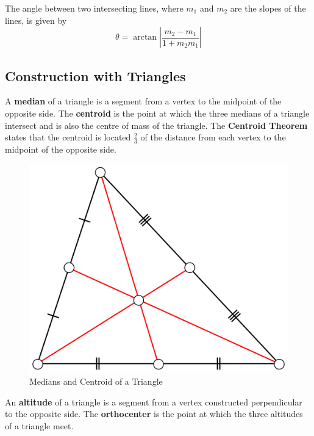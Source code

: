 \documentclass{article}
\begin{document}
            \noindent The angle between two intersecting lines, where $m_1$ and $m_2$ are the slopes
            of the lines, is given by \\

            \begin{equation*}
                \theta = \arctan{\left|\frac{m_2-m_1}{1+m_2m_1}\right|}
            \end{equation*}

        \subsection{Construction with Triangles}
            A \textbf{median} of a triangle is a segment from a vertex to the midpoint of the opposite
            side. The \textbf{centroid} is the point at which the three medians of a triangle intersect
            and is also the centre of mass of the triangle. The \color{purple} \textbf{Centroid Theorem}
            \color{black} states that the centroid is located $\frac{2}{3}$ of the distance from each
            vertex to the midpoint of the opposite side. \\

            \begin{figure} [hbt!]
                \centering
                \includegraphics[scale = 0.075] {Resources/Unit2Triangles/centroid.PNG}
                \caption*{Medians and Centroid of a Triangle}
            \end{figure}

            \noindent An \textbf{altitude} of a triangle is a segment from a vertex constructed
            perpendicular to the opposite side. The \textbf{orthocenter} is the point at which the
            three altitudes of a triangle meet.
\end{document}
